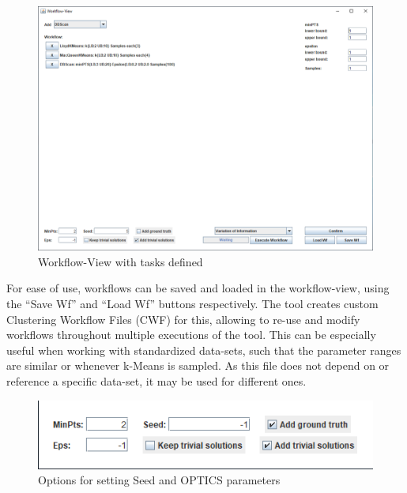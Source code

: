 \documentclass[
	a4paper,
	english,
	twoside,
	openright,               
	11pt                            
	]{report}
\begin{document}
\begin{figure}[h]
	\centering
	\includegraphics[scale=.43]{workflow-view-tasks}
	\caption{Workflow-View with tasks defined}
	\label{fig:workflow-view-tasks}
\end{figure}

For ease of use, workflows can be saved and loaded in the workflow-view, using the ``Save Wf'' and ``Load Wf'' buttons respectively. The tool creates custom Clustering Workflow Files (CWF) for this, allowing to re-use and modify workflows throughout multiple executions of the tool. This can be especially useful when working with standardized data-sets, such that the parameter ranges are similar or whenever k-Means is sampled. As this file does not depend on or reference a specific data-set, it may be used for different ones.

\begin{figure}[h]
	\centering
	\includegraphics[scale=.75]{workflow-options}
	\caption{Options for setting Seed and OPTICS parameters}
	\label{fig:workflow-options}
\end{figure}
\end{document}
